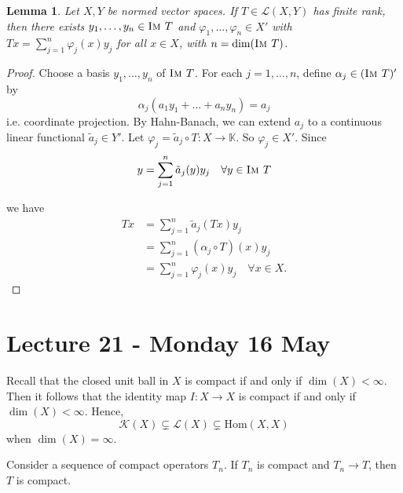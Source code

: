 \documentclass[10pt, oneside, reqno]{amsart}
\theoremstyle{plain}%
\newtheorem{lem}[thm]{Lemma}
\theoremstyle{definition}
\theoremstyle{remark}
\newcommand{\K}{\mathbb{K}}
\renewcommand{\phi}{\varphi}
\newcommand{\im}{\textsc{Im\ }}
\begin{document}
\begin{lem}
    Let $X, Y$ be normed vector spaces.  If $T \in \mathcal L(X,Y)$ has finite rank, then there exists $y_1, \dots, y_n \in \im T$ and $\phi_1, \dots, \phi_n \in X'$ with $Tx = \sum_{j=1}^n \phi_j(x) y_j$ for all $x \in X$, with $n = \dim( \im T)$. 
\end{lem}

\begin{proof}
    Choose a basis $y_1, \dots, y_n$ of $\im T$.  For each $j = 1, \dots, n$, define $\alpha_j \in (\im T)'$ by \[
        \alpha_j(a_1 y_1 + \dots + a_n y_n) = a_j
    \] i.e. coordinate projection.  By Hahn-Banach, we can extend $a_j$ to a continuous linear functional $\tilde a_j \in Y'$.  Let $\phi_j = \tilde a_j \circ T : X \rightarrow \K$.  So $\phi_j \in X'$.  Since \[
         y = \sum_{j=1}^n \tilde a_j(y) y_j \quad \forall y \in \im T
    \] 
    
    we have \begin{align*}
        Tx  &= \sum_{j= 1}^n \tilde a_j (Tx) y_j \\
            &= \sum_{j=1}^n (\alpha_j \circ T)(x) y_j    \\
            &= \sum_{j=1}^n \phi_j(x) y_j \quad \forall x \in X.
    \end{align*}
\end{proof}

\section{Lecture 21 - Monday 16 May} %
\label{sec:lecture_21_monday_16_may}


Recall that the closed unit ball in $X$ is compact if and only if $\dim(X) < \infty$.  Then it follows that the identity map $I : X \rightarrow X$ is compact if and only if $\dim(X) < \infty$.  Hence, \[
    \mathcal K(X) \subsetneq \mathcal L(X) \subsetneq \text{Hom}(X, X) 
\] when $\dim(X) = \infty$.    

Consider a sequence of compact operators $T_n$.  If $T_n$ is compact and $T_n \rightarrow T$, then $T$ is compact.  
\end{document}
